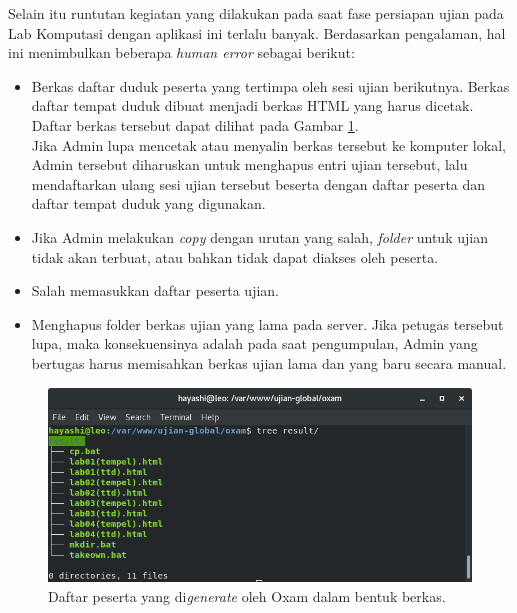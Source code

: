 Selain itu runtutan kegiatan yang dilakukan pada saat fase persiapan ujian pada
Lab Komputasi dengan aplikasi ini terlalu banyak. Berdasarkan pengalaman,
hal ini menimbulkan beberapa \textit{human error} sebagai berikut:
    \begin{itemize}
        \item Berkas daftar duduk peserta yang tertimpa oleh sesi ujian
            berikutnya. Berkas daftar tempat duduk dibuat menjadi berkas HTML
            yang harus dicetak. Daftar berkas tersebut dapat dilihat pada Gambar
            \ref{fig:ss-folder-gen}.\\
            Jika Admin lupa mencetak atau menyalin berkas tersebut ke komputer
            lokal, Admin tersebut diharuskan untuk menghapus entri ujian
            tersebut, lalu mendaftarkan ulang sesi ujian tersebut beserta dengan
            daftar peserta dan daftar tempat duduk yang digunakan.

        \item Jika Admin melakukan \textit{copy} dengan urutan yang salah, \textit{folder} untuk
            ujian tidak akan terbuat, atau bahkan tidak dapat diakses oleh peserta.
        
        \item Salah memasukkan daftar peserta ujian.
        
        \item Menghapus folder berkas ujian yang lama pada server. Jika petugas
            tersebut lupa, maka konsekuensinya adalah pada saat pengumpulan,
            Admin yang bertugas harus memisahkan berkas ujian lama dan yang baru
            secara manual.
    \end{itemize}

\begin{figure}
    \centering
    \includegraphics[width=0.7\paperwidth]{Gambar/ss-struktur-folder-generator.png}
    \caption{Daftar peserta yang di\textit{generate} oleh Oxam dalam bentuk
    berkas.}
    \label{fig:ss-folder-gen}
\end{figure}

